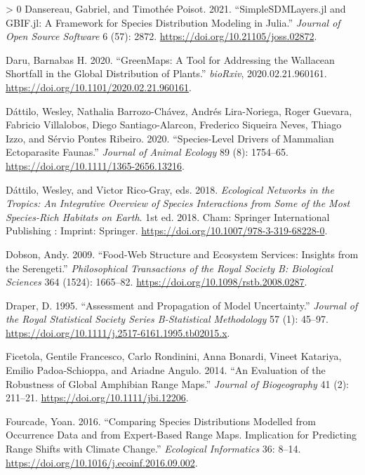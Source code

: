 \documentclass[10pt,oneside]{article}
\newlength{\cslhangindent}
\newenvironment{CSLReferences}[3] %
 {%
  \setlength{\parindent}{0pt}
  \ifodd #1 \everypar{\setlength{\hangindent}{\cslhangindent}}\ignorespaces\fi
  \ifnum #2 > 0
  \setlength{\parskip}{#2\baselineskip}
  \fi
 }%
 {}
\begin{document}
\begin{CSLReferences}{1}{0}
\leavevmode\hypertarget{ref-Dansereau2021SimJl}{}%
Dansereau, Gabriel, and Timothée Poisot. 2021. {``SimpleSDMLayers.jl and
GBIF.jl: A Framework for Species Distribution Modeling in Julia.''}
\emph{Journal of Open Source Software} 6 (57): 2872.
\url{https://doi.org/10.21105/joss.02872}.

\leavevmode\hypertarget{ref-Daru2020GreToo}{}%
Daru, Barnabas H. 2020. {``GreenMaps: A Tool for Addressing the
Wallacean Shortfall in the Global Distribution of Plants.''}
\emph{bioRxiv}, 2020.02.21.960161.
\url{https://doi.org/10.1101/2020.02.21.960161}.

\leavevmode\hypertarget{ref-Dattilo2020SpeDri}{}%
Dáttilo, Wesley, Nathalia Barrozo-Chávez, Andrés Lira-Noriega, Roger
Guevara, Fabricio Villalobos, Diego Santiago-Alarcon, Frederico Siqueira
Neves, Thiago Izzo, and Sérvio Pontes Ribeiro. 2020. {``Species-Level
Drivers of Mammalian Ectoparasite Faunas.''} \emph{Journal of Animal
Ecology} 89 (8): 1754--65.
\url{https://doi.org/10.1111/1365-2656.13216}.

\leavevmode\hypertarget{ref-Dattilo2018EcoNet}{}%
Dáttilo, Wesley, and Victor Rico-Gray, eds. 2018. \emph{Ecological
Networks in the Tropics: An Integrative Overview of Species Interactions
from Some of the Most Species-Rich Habitats on Earth}. 1st ed. 2018.
Cham: Springer International Publishing : Imprint: Springer.
\url{https://doi.org/10.1007/978-3-319-68228-0}.

\leavevmode\hypertarget{ref-Dobson2009FooStr}{}%
Dobson, Andy. 2009. {``Food-Web Structure and Ecosystem Services:
Insights from the Serengeti.''} \emph{Philosophical Transactions of the
Royal Society B: Biological Sciences} 364 (1524): 1665--82.
\url{https://doi.org/10.1098/rstb.2008.0287}.

\leavevmode\hypertarget{ref-Draper1995AssPro}{}%
Draper, D. 1995. {``Assessment and Propagation of Model Uncertainty.''}
\emph{Journal of the Royal Statistical Society Series B-Statistical
Methodology} 57 (1): 45--97.
\url{https://doi.org/10.1111/j.2517-6161.1995.tb02015.x}.

\leavevmode\hypertarget{ref-Ficetola2014EvaRob}{}%
Ficetola, Gentile Francesco, Carlo Rondinini, Anna Bonardi, Vineet
Katariya, Emilio Padoa-Schioppa, and Ariadne Angulo. 2014. {``An
Evaluation of the Robustness of Global Amphibian Range Maps.''}
\emph{Journal of Biogeography} 41 (2): 211--21.
\url{https://doi.org/10.1111/jbi.12206}.

\leavevmode\hypertarget{ref-Fourcade2016ComSpe}{}%
Fourcade, Yoan. 2016. {``Comparing Species Distributions Modelled from
Occurrence Data and from Expert-Based Range Maps. Implication for
Predicting Range Shifts with Climate Change.''} \emph{Ecological
Informatics} 36: 8--14.
\url{https://doi.org/10.1016/j.ecoinf.2016.09.002}.


\end{CSLReferences}
\end{document}
